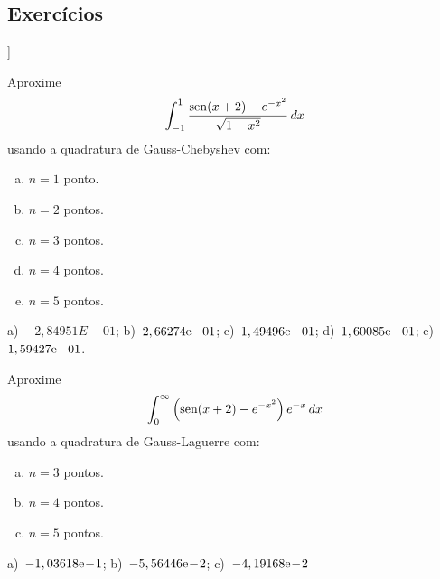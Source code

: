 \subsection*{Exercícios}

\begin{flushleft}
  [[tag:revisar]]
\end{flushleft}

\begin{exer}\label{exer:GL_fun}
  Aproxime
  \begin{equation}
    \int_{-1}^1 \frac{\operatorname{sen}(x+2)-e^{-x^2}}{\sqrt{1-x^2}}\,dx
  \end{equation}
usando a quadratura de Gauss-Chebyshev com:
\begin{enumerate}[a)]
\item $n=1$ ponto.
\item $n=2$ pontos.
\item $n=3$ pontos.
\item $n=4$ pontos.
\item $n=5$ pontos.
\end{enumerate}
\end{exer}
\begin{resp}
  a)~$-2,84951E-01$; b)~$2,66274\mathrm{e}\!-\!01$; c)~$1,49496\mathrm{e}\!-\!01$; d)~$1,60085\mathrm{e}\!-\!01$; e)~$1,59427\mathrm{e}\!-\!01$.
\end{resp}

\begin{exer}\label{exer:GLa_fun}
  Aproxime
  \begin{equation}
    \int_{0}^\infty \left(\operatorname{sen}(x+2)-e^{-x^2}\right)e^{-x}\,dx
  \end{equation}
usando a quadratura de Gauss-Laguerre com:
\begin{enumerate}[a)]
\item $n=3$ pontos.
\item $n=4$ pontos.
\item $n=5$ pontos.
\end{enumerate}
\end{exer}
\begin{resp}
  a)~$-1,03618\mathrm{e}\!-\!1$; b)~$-5,56446\mathrm{e}\!-\!2$; c)~$-4,19168\mathrm{e}\!-\!2$
\end{resp}

